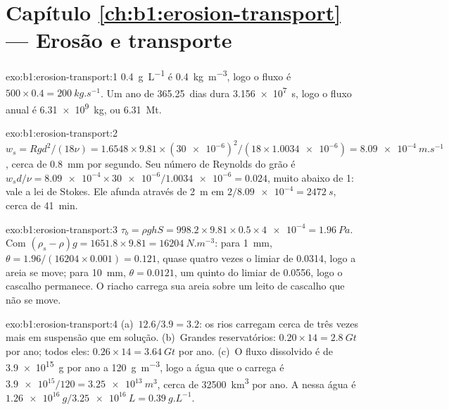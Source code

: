 \section*{Capítulo \ref{ch:b1:erosion-transport} --- Erosão e transporte}

\begin{solution}{exo:b1:erosion-transport:1}
\qty{0.4}{g.L^{-1}} é \qty{0.4}{kg.m^{-3}}, logo o fluxo é $500 \times 0.4 =
\qty{200}{kg.s^{-1}}$. Um ano de \num{365.25}~dias dura \qty{3.156e7}{s}, logo o fluxo anual é \qty{6.31e9}{kg}, ou \qty{6.31}{Mt}.
\end{solution}

\begin{solution}{exo:b1:erosion-transport:2}
$w_s = R g d^2/(18\nu) = 1.6548 \times 9.81 \times (\num{30e-6})^2/(18 \times
\num{1.0034e-6}) = \qty{8.09e-4}{m.s^{-1}}$, cerca de \qty{0.8}{mm} por segundo. Seu número de Reynolds do grão é $w_s d/\nu = \num{8.09e-4} \times
\num{30e-6}/\num{1.0034e-6} = 0.024$, muito abaixo de 1: vale a lei de Stokes. Ele afunda através de \qty{2}{m} em $2/\num{8.09e-4} = \qty{2472}{s}$, cerca de
\qty{41}{min}.
\end{solution}

\begin{solution}{exo:b1:erosion-transport:3}
$\tau_b = \rho g h S = 998.2 \times 9.81 \times 0.5 \times \num{4e-4} =
\qty{1.96}{Pa}$. Com $(\rho_s - \rho) g = 1651.8 \times 9.81 =
\qty{16204}{N.m^{-3}}$: para \qty{1}{mm}, $\theta = 1.96/(16204 \times 0.001) =
0.121$, quase quatro vezes o limiar de \num{0.0314}, logo a areia se move; para
\qty{10}{mm}, $\theta = 0.0121$, um quinto do limiar de \num{0.0556}, logo o cascalho permanece. O riacho carrega sua areia sobre um leito de cascalho que não se move.
\end{solution}

\begin{solution}{exo:b1:erosion-transport:4}
(a)~$12.6/3.9 = 3.2$: os rios carregam cerca de três vezes mais em suspensão que em solução. (b)~Grandes reservatórios: $0.20 \times 14 = \qty{2.8}{Gt}$ por ano; todos eles: $0.26 \times 14 = \qty{3.64}{Gt}$ por ano. (c)~O fluxo dissolvido é de \qty{3.9e15}{g} por ano a \qty{120}{g.m^{-3}}, logo a água que o carrega é $\num{3.9e15}/120 = \qty{3.25e13}{m^3}$, cerca de \qty{32500}{km^3} por ano. A  nessa água é $\qty{1.26e16}{g}/\qty{3.25e16}{L} =
\qty{0.39}{g.L^{-1}}$.
\end{solution}

